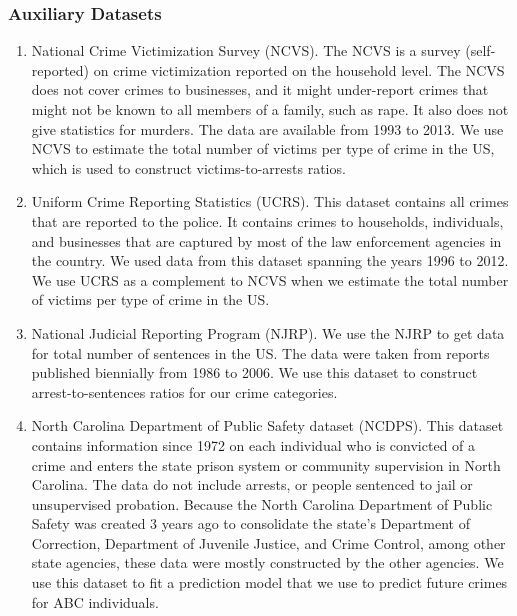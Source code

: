 \subsubsection{Auxiliary Datasets}
\begin{enumerate}
\item National Crime Victimization Survey (NCVS). The NCVS is a survey (self-reported) on crime victimization reported on the household level. The NCVS does not cover crimes to businesses, and it might under-report crimes that might not be known to all members of a family, such as rape. It also does not give statistics for murders. The data are available from 1993 to 2013. We use NCVS to estimate the total number of victims per type of crime in the US, which is used to construct victims-to-arrests ratios.
\item Uniform Crime Reporting Statistics (UCRS). This dataset contains all crimes that are reported to the police. It contains crimes to households, individuals, and businesses that are captured by most of the law enforcement agencies in the country. We used data from this dataset spanning the years 1996 to 2012. We use UCRS as a complement to NCVS when we estimate the total number of victims per type of crime in the US. %
\item National Judicial Reporting Program (NJRP). We use the NJRP to get data for total number of sentences in the US. The data were taken from reports published biennially from 1986 to 2006. We use this dataset to construct arrest-to-sentences ratios for our crime categories.
\item North Carolina Department of Public Safety dataset (NCDPS). This dataset contains information since 1972 on each individual who is convicted of a crime and enters the state prison system or community supervision in North Carolina. The data do not include arrests, or people sentenced to jail or unsupervised probation. Because the North Carolina Department of Public Safety was created 3 years ago to consolidate the state's Department of Correction, Department of Juvenile Justice, and Crime Control, among other state agencies, these data were mostly constructed by the other agencies. We use this dataset to fit a prediction model that we use to predict future crimes for ABC individuals.
\end{enumerate}

